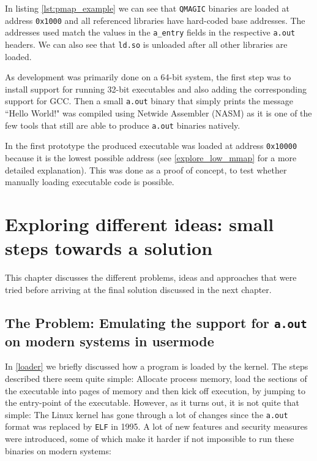 \documentclass{article}
\begin{document}
In listing \ref{lst:pmap_example} we can see that \texttt{QMAGIC} binaries are loaded at address \texttt{0x1000} and all referenced libraries have hard-coded base addresses. The addresses used match the values in the \texttt{a\_entry} fields in the respective \texttt{a.out} headers. We can also see that \texttt{ld.so} is unloaded after all other libraries are loaded.

As development was primarily done on a 64-bit system, the first step was to install support for running 32-bit executables and also adding the corresponding support for GCC. Then a small \texttt{a.out} binary that simply prints the message ``Hello World!" was compiled using Netwide Assembler (NASM) as it is one of the few tools that still are able to produce \texttt{a.out} binaries natively.

In the first prototype the produced executable was loaded at address \texttt{0x10000} because it is the lowest possible address (see \ref{explore_low_mmap} for a more detailed explanation). This was done as a proof of concept, to test whether manually loading executable code is possible.

\section{Exploring different ideas: small steps towards a solution}
\label{explore}

This chapter discusses the different problems, ideas and approaches that were tried before arriving at the final solution discussed in the next chapter.

\subsection{The Problem: Emulating the support for \texttt{a.out} on modern systems in usermode}
\label{the_problem}

In \ref{loader} we briefly discussed how a program is loaded by the kernel. The steps described there seem quite simple: Allocate process memory, load the sections of the executable into pages of memory and then kick off execution, by jumping to the entry-point of the executable. However, as it turns out, it is not quite that simple: The Linux kernel has gone through a lot of changes since the \texttt{a.out} format was replaced by \texttt{ELF} in 1995. A lot of new features and security measures were introduced, some of which make it harder if not impossible to run these binaries on modern systems:
\end{document}
